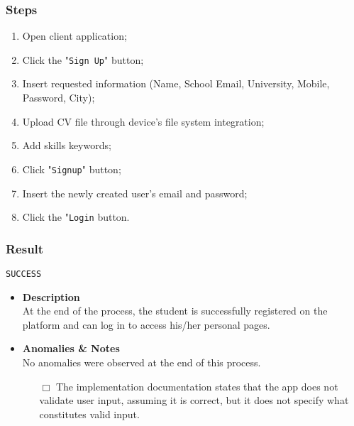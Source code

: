 \subsubsection{Steps}
\begin{enumerate}
    \item Open client application;
    \item Click the "\verb|Sign Up|" button;
    \item Insert requested information (Name, School Email, University, Mobile, Password, City);
    \item Upload CV file through device's file system integration;
    \item Add skills keywords;
    \item Click "\verb|Signup|" button;
    \item Insert the newly created user’s email and password;
    \item Click the "\verb|Login| button.
\end{enumerate}
\subsubsection{Result}
\verb|SUCCESS|
\begin{itemize}
    \item \textbf{\color{titleColor} Description}\\
    At the end of the process, the student is successfully registered on the platform and can log in to access his/her personal pages.
    \item \textbf{\color{titleColor} Anomalies \& Notes}\\
    No anomalies were observed at the end of this process.
    \begin{itemize}
            \item [{\color{titleColor}\(\Box \)}]The implementation documentation states that the app does not validate user input, assuming it is correct, but it does not specify what constitutes valid input.
        \end{itemize} 
\end{itemize}
